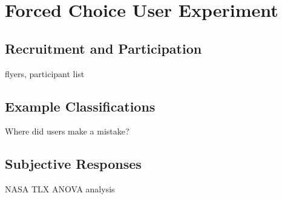 \section{Forced Choice User Experiment}

\subsection{Recruitment and Participation}

flyers, participant list

\subsection{Example Classifications}

Where did users make a mistake?

\subsection{Subjective Responses}

NASA TLX ANOVA analysis